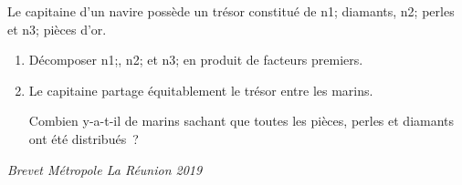 \documentclass[exercice]{thedocument}%
\begin{document}
%
Le capitaine d'un navire possède un trésor constitué de \<n1; diamants,
\<n2; perles et \<n3; pièces d'or.
\begin{enumerate}
    \item Décomposer \<n1;, \<n2; et \<n3; en produit de facteurs premiers.
    \item Le capitaine partage équitablement le trésor entre les marins.\par
    \noindent Combien y-a-t-il de marins sachant que toutes les pièces, perles et
    diamants ont été distribués~?
\end{enumerate}\vskip10pt\hfill{\itshape Brevet Métropole La Réunion 2019}
\end{document}
